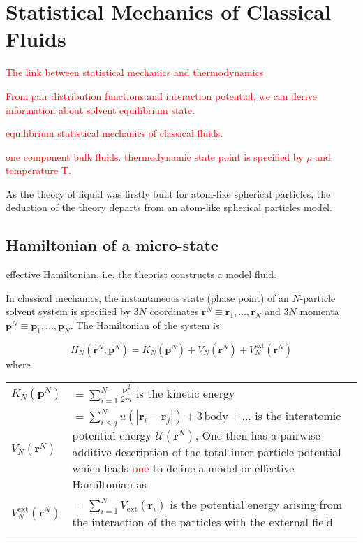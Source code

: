 
\chapter{Statistical Mechanics of Classical Fluids \label{chpt:statistical-mechanics}}

\textcolor{red}{The link between statistical mechanics and thermodynamics}

\textcolor{red}{From pair distribution functions and interaction potential,
we can derive information about solvent equilibrium state.}

\textcolor{red}{equilibrium statistical mechanics of classical fluids.}

\textcolor{red}{one component bulk fluids. thermodynamic state point
is specified by $\rho$ and temperature T. }

As the theory of liquid was firstly built for atom-like spherical
particles, the deduction of the theory departs from an atom-like spherical
particles model.


\section{Hamiltonian of a micro-state}

effective Hamiltonian, i.e. the theorist constructs a model fluid. 

In classical mechanics, the instantaneous state (phase point) of an
$N$-particle solvent system is specified by $3N$ coordinates $\mathbf{r}^{N}\equiv\mathbf{r}_{1},\ldots,\mathbf{r}_{N}$
and $3N$ momenta $\mathbf{p}^{N}\equiv\mathbf{p}_{1},\ldots,\mathbf{p}_{N}$.
The Hamiltonian of the system is

\begin{equation}
H_{N}(\mathbf{r}^{N},\mathbf{p}^{N})=K_{N}(\mathbf{p}^{N})+V_{N}(\mathbf{r}^{N})+V_{N}^{\mathrm{ext}}(\mathbf{r}^{N})
\end{equation}
where

\begin{tabular}{ll}
$K_{N}(\mathbf{p}^{N})$ & $={\displaystyle \sum_{i=1}^{N}\frac{\mathbf{p}_{i}^{2}}{2m}}$ is
the kinetic energy \tabularnewline
$V_{N}(\mathbf{r}^{N})$ & $={\displaystyle \sum_{i<j}^{N}u(\left|\mathbf{r}_{i}-\mathbf{r}_{j}\right|)+3\,\mathrm{body}+\ldots}$
is the interatomic potential energy $\mathcal{U}(\mathbf{r}^{N})$,
One then has a pairwise additive description of the total inter-particle
potential which leads \textcolor{red}{one} to define a model or effective
Hamiltonian as\tabularnewline
$V_{N}^{\mathrm{ext}}(\mathbf{r}^{N})$ & $={\displaystyle \sum_{i=1}^{N}}V_{\mathrm{ext}}(\mathbf{r}_{i})$
is the potential energy arising from the interaction of the particles
with the external field\tabularnewline
 & \tabularnewline
\end{tabular}

